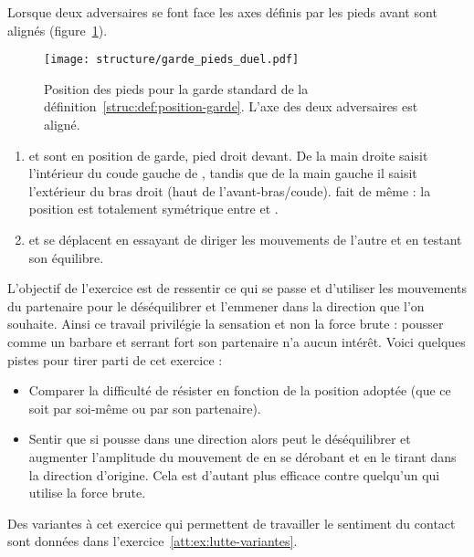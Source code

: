 Lorsque deux adversaires se font face les axes définis par les pieds avant sont alignés (figure~\ref{struc:fig:garde-pieds-duel}).

\begin{figure}[ht]
	\centering
	\texttt{[image: structure/garde\_pieds\_duel.pdf]}
	\caption{Position des pieds pour la garde standard de la définition~\ref{struc:def:position-garde}.
	L'axe des deux adversaires est aligné.}
	\label{struc:fig:garde-pieds-duel}
\end{figure}


\begin{exercice}
	\label{struc:ex:lutte}



	\begin{enumerate}
		\item \A et \D sont en position de garde, pied droit devant.
		De la main droite \A saisit l'intérieur du coude gauche de \D, tandis que de la main gauche il saisit l'extérieur du bras droit (haut de l'avant-bras/coude).
		\D fait de même : la position est totalement symétrique entre \A et \D.
		
		\item \A et \D se déplacent en essayant de diriger les mouvements de l'autre et en testant son équilibre.
	\end{enumerate}

	L'objectif de l'exercice est de ressentir ce qui se passe et d'utiliser les mouvements du partenaire pour le déséquilibrer et l'emmener dans la direction que l'on souhaite.
	Ainsi ce travail privilégie la sensation et non la force brute : pousser comme un barbare et serrant fort son partenaire n'a aucun intérêt.
	Voici quelques pistes pour tirer parti de cet exercice :
	\begin{itemize}
		\item Comparer la difficulté de résister en fonction de la position adoptée (que ce soit par soi-même ou par son partenaire).
		
		\item Sentir que si \A pousse dans une direction alors \D peut le déséquilibrer et augmenter l'amplitude du mouvement de \A en se dérobant et en le tirant dans la direction d'origine.
		Cela est d'autant plus efficace contre quelqu'un qui utilise la force brute.
	\end{itemize}

	Des variantes à cet exercice qui permettent de travailler le sentiment du contact sont données dans l'exercice~\ref{att:ex:lutte-variantes}.

\end{exercice}


